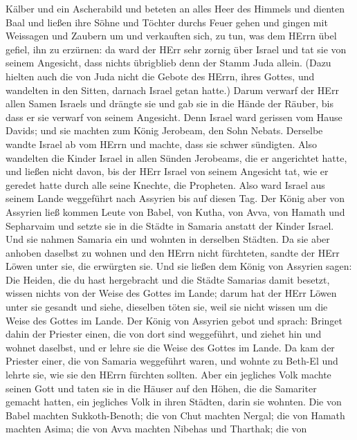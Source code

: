 Kälber und ein Ascherabild und beteten an alles Heer des Himmels und
dienten Baal  und ließen ihre Söhne und Töchter durchs
Feuer gehen und gingen mit Weissagen und Zaubern um und verkauften sich,
zu tun, was dem HErrn übel gefiel, ihn zu erzürnen:  da
ward der HErr sehr zornig über Israel und tat sie von seinem Angesicht,
dass nichts übrigblieb denn der Stamm Juda allein.  (Dazu
hielten auch die von Juda nicht die Gebote des HErrn, ihres Gottes, und
wandelten in den Sitten, darnach Israel getan hatte.) 
Darum verwarf der HErr allen Samen Israels und drängte sie und gab sie
in die Hände der Räuber, bis dass er sie verwarf von seinem Angesicht.
 Denn Israel ward gerissen vom Hause Davids; und sie
machten zum König Jerobeam, den Sohn Nebats. Derselbe wandte Israel ab
vom HErrn und machte, dass sie schwer sündigten.  Also
wandelten die Kinder Israel in allen Sünden Jerobeams, die er
angerichtet hatte, und ließen nicht davon,  bis der HErr
Israel von seinem Angesicht tat, wie er geredet hatte durch alle seine
Knechte, die Propheten. Also ward Israel aus seinem Lande weggeführt
nach Assyrien bis auf diesen Tag.  Der König aber von
Assyrien ließ kommen Leute von Babel, von Kutha, von Avva, von Hamath
und Sepharvaim und setzte sie in die Städte in Samaria anstatt der
Kinder Israel. Und sie nahmen Samaria ein und wohnten in derselben
Städten.  Da sie aber anhoben daselbst zu wohnen und den
HErrn nicht fürchteten, sandte der HErr Löwen unter sie, die erwürgten
sie.  Und sie ließen dem König von Assyrien sagen: Die
Heiden, die du hast hergebracht und die Städte Samarias damit besetzt,
wissen nichts von der Weise des Gottes im Lande; darum hat der HErr
Löwen unter sie gesandt und siehe, dieselben töten sie, weil sie nicht
wissen um die Weise des Gottes im Lande.  Der König von
Assyrien gebot und sprach: Bringet dahin der Priester einen, die von
dort sind weggeführt, und ziehet hin und wohnet daselbst, und er lehre
sie die Weise des Gottes im Lande.  Da kam der Priester
einer, die von Samaria weggeführt waren, und wohnte zu Beth-El und
lehrte sie, wie sie den HErrn fürchten sollten.  Aber ein
jegliches Volk machte seinen Gott und taten sie in die Häuser auf den
Höhen, die die Samariter gemacht hatten, ein jegliches Volk in ihren
Städten, darin sie wohnten.  Die von Babel machten
Sukkoth-Benoth; die von Chut machten Nergal; die von Hamath machten
Asima;  die von Avva machten Nibehas und Tharthak; die von
